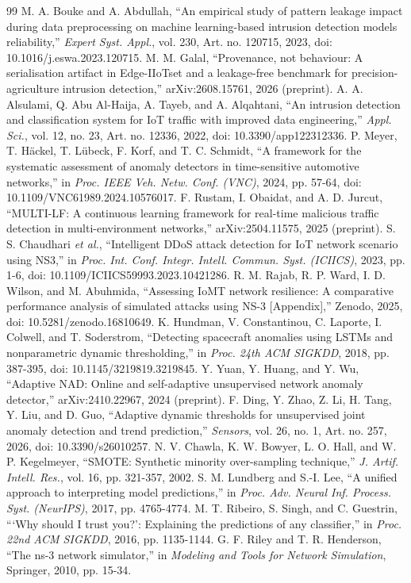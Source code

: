 \begin{thebibliography}{99}
 M. A. Bouke and A. Abdullah, ``An empirical study of pattern leakage impact during data preprocessing on machine learning-based intrusion detection models reliability,'' \textit{Expert Syst. Appl.}, vol. 230, Art. no. 120715, 2023, doi: 10.1016/j.eswa.2023.120715.
 M. M. Galal, ``Provenance, not behaviour: A serialisation artifact in Edge-IIoTset and a leakage-free benchmark for precision-agriculture intrusion detection,'' arXiv:2608.15761, 2026 (preprint).
 A. A. Alsulami, Q. Abu Al-Haija, A. Tayeb, and A. Alqahtani, ``An intrusion detection and classification system for IoT traffic with improved data engineering,'' \textit{Appl. Sci.}, vol. 12, no. 23, Art. no. 12336, 2022, doi: 10.3390/app122312336.
 P. Meyer, T. Häckel, T. Lübeck, F. Korf, and T. C. Schmidt, ``A framework for the systematic assessment of anomaly detectors in time-sensitive automotive networks,'' in \textit{Proc. IEEE Veh. Netw. Conf. (VNC)}, 2024, pp. 57-64, doi: 10.1109/VNC61989.2024.10576017.
 F. Rustam, I. Obaidat, and A. D. Jurcut, ``MULTI-LF: A continuous learning framework for real-time malicious traffic detection in multi-environment networks,'' arXiv:2504.11575, 2025 (preprint).
 S. S. Chaudhari \textit{et al.}, ``Intelligent DDoS attack detection for IoT network scenario using NS3,'' in \textit{Proc. Int. Conf. Integr. Intell. Commun. Syst. (ICIICS)}, 2023, pp. 1-6, doi: 10.1109/ICIICS59993.2023.10421286.
 R. M. Rajab, R. P. Ward, I. D. Wilson, and M. Abuhmida, ``Assessing IoMT network resilience: A comparative performance analysis of simulated attacks using NS-3 [Appendix],'' Zenodo, 2025, doi: 10.5281/zenodo.16810649.
 K. Hundman, V. Constantinou, C. Laporte, I. Colwell, and T. Soderstrom, ``Detecting spacecraft anomalies using LSTMs and nonparametric dynamic thresholding,'' in \textit{Proc. 24th ACM SIGKDD}, 2018, pp. 387-395, doi: 10.1145/3219819.3219845.
 Y. Yuan, Y. Huang, and Y. Wu, ``Adaptive NAD: Online and self-adaptive unsupervised network anomaly detector,'' arXiv:2410.22967, 2024 (preprint).
 F. Ding, Y. Zhao, Z. Li, H. Tang, Y. Liu, and D. Guo, ``Adaptive dynamic thresholds for unsupervised joint anomaly detection and trend prediction,'' \textit{Sensors}, vol. 26, no. 1, Art. no. 257, 2026, doi: 10.3390/s26010257.
 N. V. Chawla, K. W. Bowyer, L. O. Hall, and W. P. Kegelmeyer, ``SMOTE: Synthetic minority over-sampling technique,'' \textit{J. Artif. Intell. Res.}, vol. 16, pp. 321-357, 2002.
 S. M. Lundberg and S.-I. Lee, ``A unified approach to interpreting model predictions,'' in \textit{Proc. Adv. Neural Inf. Process. Syst. (NeurIPS)}, 2017, pp. 4765-4774.
 M. T. Ribeiro, S. Singh, and C. Guestrin, ```Why should I trust you?': Explaining the predictions of any classifier,'' in \textit{Proc. 22nd ACM SIGKDD}, 2016, pp. 1135-1144.
 G. F. Riley and T. R. Henderson, ``The ns-3 network simulator,'' in \textit{Modeling and Tools for Network Simulation}, Springer, 2010, pp. 15-34.
\end{thebibliography}
